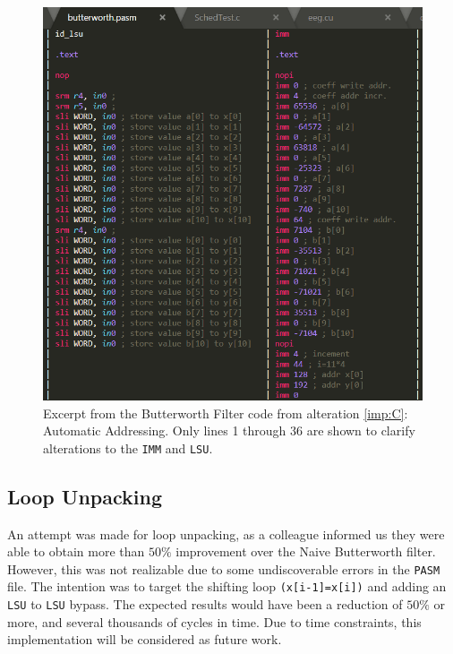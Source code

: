 \documentclass[letterpaper, 10 pt, conference]{ieeeconf}  %
\begin{document}
\begin{figure}[ht]
\begin{center}
\includegraphics[width=\linewidth]{images/assem01.png}
\caption{Excerpt from the Butterworth Filter code from alteration \ref{imp:C}: Automatic Addressing. Only lines 1 through 36 are shown to clarify alterations to the \texttt{IMM} and \texttt{LSU}.}
\label{fig:assem01}
\end{center}
\end{figure}

\subsection{Loop Unpacking}
\label{imp:D}

An attempt was made for loop unpacking, as a colleague informed us they were able to obtain more than $50\%$ improvement over the Naive Butterworth filter. However, this was not realizable due to some undiscoverable errors in the \texttt{PASM} file. The intention was to target the shifting loop \texttt{(x[i-1]=x[i])} and adding an \texttt{LSU} to \texttt{LSU} bypass. The expected results would have been a reduction of $50\%$ or more, and several thousands of cycles in time. Due to time constraints, this implementation will be considered as future work.  
\end{document}
